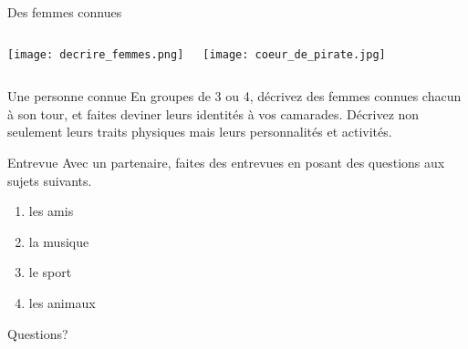 \documentclass{beamer}
\begin{document}
  \begin{frame}{Des femmes connues}
    \begin{columns}
        \texttt{[image: decrire\_femmes.png]}
        \begin{minipage}[t][0.6\textheight]{\linewidth}
          \texttt{[image: coeur\_de\_pirate.jpg]}
        \end{minipage}
    \end{columns}
  \end{frame}

  \begin{frame}{Une personne connue}
    En groupes de 3 ou 4, décrivez des femmes connues chacun à son tour, et faites deviner leurs identités à vos camarades. Décrivez non seulement leurs traits physiques mais leurs personnalités et activités. \\
  \end{frame}

  \begin{frame}{Entrevue}
    Avec un partenaire, faites des entrevues en posant des questions aux sujets suivants.  \\
    \begin{enumerate}
      \item les amis
      \item la musique
      \item le sport
      \item les animaux
    \end{enumerate}
  \end{frame}

  \begin{frame}{}
    \begin{center}
      \Large Questions?
    \end{center}
  \end{frame}
\end{document}
